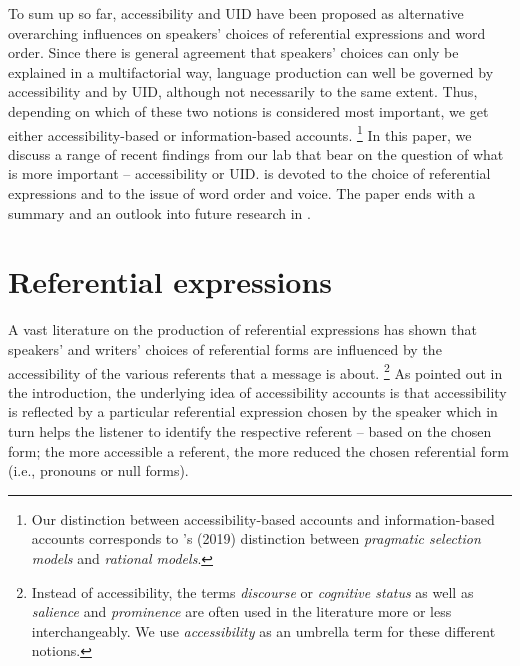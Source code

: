 \documentclass[output=paper,colorlinks,citecolor=brown]{langscibook}
\begin{document}
To sum up so far, accessibility and UID have been proposed as alternative overarching influences on speakers' choices of referential expressions and word order. Since there is general agreement that  speakers' choices can only be explained in a multifactorial way, language production can well be governed by accessibility and by UID, although not necessarily to the same extent. Thus, depending on which of these two notions is considered most important, we get either accessibility-based or information-based accounts.%
\footnote{Our distinction between accessibility-based accounts and information-based accounts corresponds to \citeauthor{Arnold::Zerkle-19}'s (2019) distinction between \emph{pragmatic selection models} and \emph{rational models}.}
In this paper, we discuss a range of recent findings from our lab that bear on the question of what is more important -- accessibility or UID.  is devoted to the choice of referential expressions and  to the issue of word order and voice. The paper ends with a summary and an outlook into future research in .


\section{Referential expressions}\label{sec:referential-expressions}

\noindent A vast literature on the production of referential expressions has shown that speakers' and writers' choices of referential forms are influenced by the accessibility of the various referents that a message is about.%
\footnote{Instead of accessibility, the terms \textit{discourse} or \textit{cognitive status} as well as \textit{salience} and \textit{prominence} are often used in the literature more or less interchangeably. We use \textit{accessibility} as an umbrella term for these different notions.}
As pointed out in the introduction, the underlying idea of accessibility accounts is that accessibility is reflected by a particular referential expression chosen by the speaker which in turn helps the listener to identify the respective referent -- based on the chosen form; the more accessible a referent, the more reduced the chosen referential form (i.e., pronouns or null forms).
\end{document}
